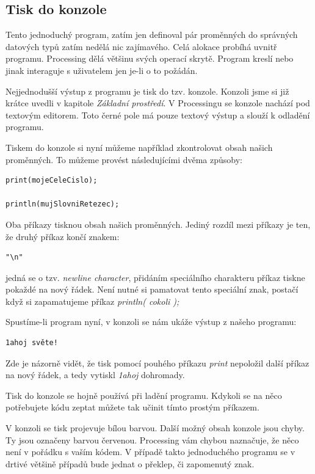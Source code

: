 \documentclass[11pt]{book}
\newcommand{\pododdil}[1]{\subsection{#1}\label{subsec:#1}}
\begin{document}
\pododdil{Tisk do konzole}

Tento jednoduchý program, zatím jen definoval pár proměnných do správných datových typů zatím nedělá nic zajímavého. Celá alokace probíhá uvnitř programu. Processing dělá většinu svých operací skrytě. Program kreslí nebo jinak interaguje s uživatelem jen je-li o to požádán.

Nejjednodušší výstup z programu je tisk do tzv. konzole. Konzoli jsme si již krátce uvedli v kapitole {\em Základní prostředí}. V Processingu se konzole nachází pod textovým editorem. Toto černé pole má pouze textový výstup a slouží k odladění programu.

Tiskem do konzole si nyní můžeme například zkontrolovat obsah našich proměnných. To můžeme provést následujícími dvěma způsoby:


\begin{lstlisting}
print(mojeCeleCislo);

println(mujSlovniRetezec);
\end{lstlisting}

Oba příkazy tisknou obsah našich proměnných. Jediný rozdíl mezi příkazy je ten, že druhý příkaz končí znakem:
 
\begin{lstlisting}
"\n"
\end{lstlisting}

jedná se o tzv. {\em newline character}, přidáním speciálního charakteru příkaz tiskne pokaždé na nový řádek. Není nutné si pamatovat tento speciální znak, postačí když si zapamatujeme příkaz {\em println( cokoli );}

Spustíme-li program nyní, v konzoli se nám ukáže výstup z našeho programu:

\begin{lstlisting}
1ahoj světe!
\end{lstlisting}

Zde je názorně vidět, že tisk pomocí pouhého příkazu {\em print} nepoložil další příkaz na nový řádek, a tedy vytiskl {\em 1ahoj} dohromady.

Tisk do konzole se hojně používá při ladění programu. Kdykoli se na něco potřebujete kódu zeptat můžete tak učinit tímto prostým příkazem.

V konzoli se tisk projevuje bílou barvou. Další možný obsah konzole jsou chyby. Ty jsou označeny barvou červenou. Processing vám chybou naznačuje, že něco není v pořádku s vaším kódem. V případě takto jednoduchého programu se v drtivé většině případů bude jednat o překlep, či zapomenutý znak.
\end{document}
